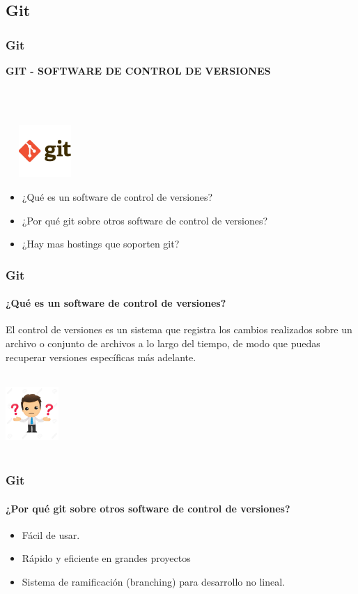 \documentclass{beamer}
\begin{document}
\subsection{Git}
	\begin{frame}
		\frametitle{Git}
		\begin{center}\textbf{\Large GIT - SOFTWARE DE CONTROL DE VERSIONES}\end{center}\\
		\\
		\begin{center}
			\includegraphics[width=3cm,height=2cm]{gitlogo.jpg}
		\end{center}
		{\small
			\begin{itemize}
				\item {¿Qué es un software de control de versiones?}
				\item {¿Por qué git sobre otros software de control de versiones?}
				\item {¿Hay mas hostings que soporten git?}
			\end{itemize}
		}
	\end{frame}
	\begin{frame}
		\frametitle{Git}
		\framesubtitle{¿Qué es un software de control de versiones?}
		El control de versiones es un sistema que registra los cambios realizados sobre un archivo o conjunto de 				archivos a lo largo del tiempo, de modo que puedas recuperar versiones específicas más adelante. 
		\\
		\begin{center}
			\includegraphics[width=2cm,height=3cm]{pregunta.jpg}
		\end{center}
	\end{frame}
	\begin{frame}
		\frametitle{Git}
		\framesubtitle{¿Por qué git sobre otros software de control de versiones?}
		\begin{itemize}	
			\item Fácil de usar.
			\item Rápido y eficiente en grandes proyectos
			\item Sistema de ramificación (branching) para desarrollo no lineal.
		\end{itemize}
	\end{frame}
\end{document}
